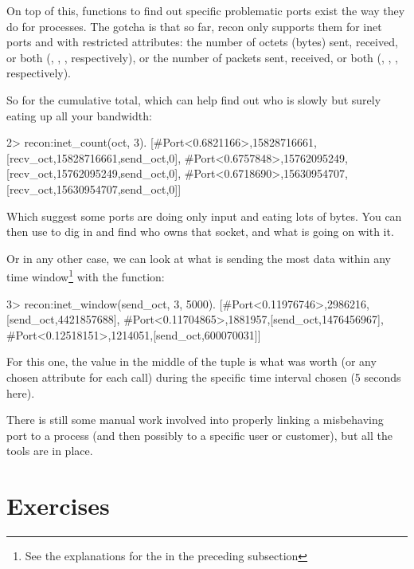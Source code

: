 \documentclass[11pt, oneside]{book}   	%
\begin{document}
On top of this, functions to find out specific problematic ports exist the way they do for processes. The gotcha is that so far, recon only supports them for inet ports and with restricted attributes: the number of octets (bytes) sent, received, or both (, , , respectively), or the number of packets sent, received, or both (, , , respectively).

So for the cumulative total, which can help find out who is slowly but surely eating up all your bandwidth:

\begin{VerbatimEshell}
2> recon:inet_count(oct, 3).
[{#Port<0.6821166>,15828716661,
  [{recv_oct,15828716661},{send_oct,0}]},
 {#Port<0.6757848>,15762095249,
  [{recv_oct,15762095249},{send_oct,0}]},
 {#Port<0.6718690>,15630954707,
  [{recv_oct,15630954707},{send_oct,0}]}]
\end{VerbatimEshell}

Which suggest some ports are doing only input and eating lots of bytes. You can then use  to dig in and find who owns that socket, and what is going on with it.

Or in any other case, we can look at what is sending the most data within any time window\footnote{See the explanations for the  in the preceding subsection} with the  function:

\begin{VerbatimEshell}
3> recon:inet_window(send_oct, 3, 5000).
[{#Port<0.11976746>,2986216,[{send_oct,4421857688}]},
 {#Port<0.11704865>,1881957,[{send_oct,1476456967}]},
 {#Port<0.12518151>,1214051,[{send_oct,600070031}]}]
\end{VerbatimEshell}

For this one, the value in the middle of the tuple is what  was worth (or any chosen attribute for each call) during the specific time interval chosen (5 seconds here).

There is still some manual work involved into properly linking a misbehaving port to a process (and then possibly to a specific user or customer), but all the tools are in place. 


\section{Exercises}
\end{document}
